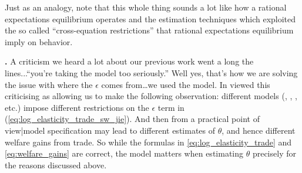 \documentclass[pdftex,12pt]{article}
\begin{document}
Just as an analogy, note that this whole thing sounds a lot like how a rational expectations equilibrium operates and the estimation techniques which exploited the so called ``cross-equation restrictions'' that rational expectations equilibrium imply on behavior.

\textbf{\citet{simonovska2014trade}. } A criticism we heard a lot about our previous work went a long the lines...``you're taking the model too seriously.'' Well yes, that's how we are solving the issue with where the $\epsilon$ comes from\ldots we used the model. In \citet{simonovska2014trade} viewed this criticising as allowing us to make the following observation: different models (\citet{and79}, \citet{eaton2002technology}, \citet{bejk03}, etc.) impose different restrictions on the $\epsilon$ term in (\ref{eq:log_elasticity_trade_sw_jie}).  And then from a practical point of view|model specification may lead to different estimates of $\theta$, and hence different welfare gains from trade. So while the formulas in \ref{eq:log_elasticity_trade} and \ref{eq:welfare_gains} are correct, the model matters when estimating $\theta$ precisely for the reasons discussed above.
\end{document}
